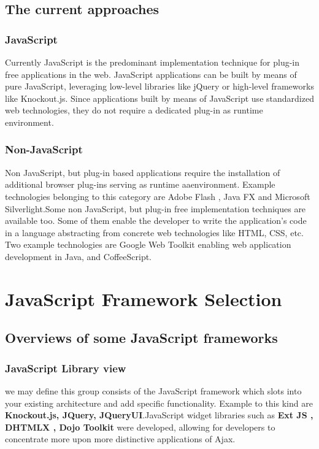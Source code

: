 \documentclass[14pt,a4paper]{extreport}
\begin{document}
		
		\subsection{The current approaches}
		
			\subsubsection{JavaScript}
		
		 Currently JavaScript is the predominant implementation technique for plug-in free applications in the web. JavaScript applications can be built by means of pure JavaScript, leveraging low-level libraries like jQuery or high-level frameworks like Knockout.js. Since applications built by means of JavaScript use standardized web technologies, they do not require a dedicated plug-in
as runtime environment.
			\subsubsection{Non-JavaScript}
		
			Non JavaScript, but plug-in based applications require the installation of additional browser plug-ins serving as runtime aaenvironment. Example technologies belonging to this category are Adobe Flash , Java FX and Microsoft Silverlight.Some non JavaScript, but plug-in free implementation techniques are available too. Some of them enable the developer to write the application’s code in a language abstracting from concrete web technologies like HTML, CSS, etc. Two example technologies are Google Web Toolkit enabling web application development in Java, and CoffeeScript.
		
	\section{JavaScript Framework Selection}
		\subsection{Overviews of some JavaScript frameworks}
		\subsubsection{JavaScript Library view}
			we may define this group consists of the JavaScript framework which slots into your existing architecture and add specific functionality. Example to this kind are \textbf{Knockout.js, JQuery, JQueryUI}.JavaScript widget libraries such as \textbf{Ext JS , DHTMLX , Dojo Toolkit} were developed, allowing for developers to concentrate more upon more distinctive applications of Ajax.
\end{document}
